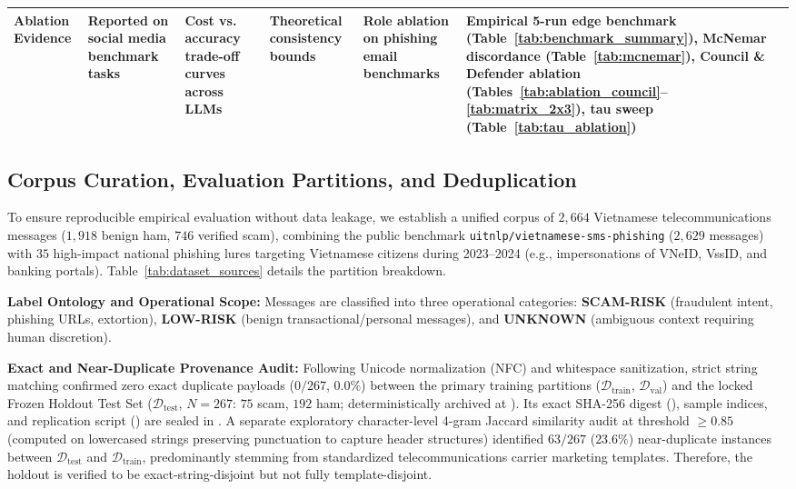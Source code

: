 \begin{table}[t]
{\begin{tabular}{p{2.6cm}p{2.6cm}p{2.6cm}p{2.6cm}p{2.8cm}p{3.4cm}}
\textbf{Ablation Evidence} & Reported on social media benchmark tasks & Cost vs. accuracy trade-off curves across LLMs & Theoretical consistency bounds & Role ablation on phishing email benchmarks & Empirical 5-run edge benchmark (Table~\ref{tab:benchmark_summary}), McNemar discordance (Table~\ref{tab:mcnemar}), Council \& Defender ablation (Tables~\ref{tab:ablation_council}--\ref{tab:matrix_2x3}), tau sweep (Table~\ref{tab:tau_ablation}) \\
\bottomrule
\end{tabular}%
}
\end{table}

\subsection{Corpus Curation, Evaluation Partitions, and Deduplication}
\label{subsec:dataset}

To ensure reproducible empirical evaluation without data leakage, we establish a unified corpus of $2,664$ Vietnamese telecommunications messages ($1,918$ benign ham, $746$ verified scam), combining the public benchmark \texttt{uitnlp/vietnamese-sms-phishing} ($2,629$ messages) with $35$ high-impact national phishing lures targeting Vietnamese citizens during 2023--2024 (e.g., impersonations of VNeID, VssID, and banking portals). Table~\ref{tab:dataset_sources} details the partition breakdown.

\textbf{Label Ontology and Operational Scope:} Messages are classified into three operational categories: \textbf{SCAM-RISK} (fraudulent intent, phishing URLs, extortion), \textbf{LOW-RISK} (benign transactional/personal messages), and \textbf{UNKNOWN} (ambiguous context requiring human discretion).

\textbf{Exact and Near-Duplicate Provenance Audit:} Following Unicode normalization (NFC) and whitespace sanitization, strict string matching confirmed zero exact duplicate payloads ($0/267$, $0.0\%$) between the primary training partitions ($\mathcal{D}_{\text{train}}$, $\mathcal{D}_{\text{val}}$) and the locked Frozen Holdout Test Set ($\mathcal{D}_{\text{test}}$, $N=267$: $75$ scam, $192$ ham; deterministically archived at ). Its exact SHA-256 digest (), sample indices, and replication script () are sealed in . A separate exploratory character-level 4-gram Jaccard similarity audit at threshold $\ge 0.85$ (computed on lowercased strings preserving punctuation to capture header structures) identified $63 / 267$ ($23.6\%$) near-duplicate instances between $\mathcal{D}_{\text{test}}$ and $\mathcal{D}_{\text{train}}$, predominantly stemming from standardized telecommunications carrier marketing templates. Therefore, the holdout is verified to be exact-string-disjoint but not fully template-disjoint. 

